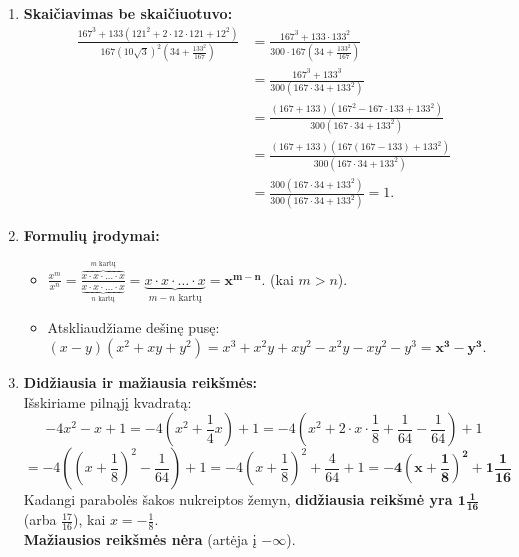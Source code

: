 \documentclass[12pt,a4paper]{article}
\begin{document}
\begin{enumerate}
    \vspace{0.3cm}
    \item \textbf{Skaičiavimas be skaičiuotuvo:} \\
    \begin{align*}
        \frac{167^3 + 133\left(121^2 + 2 \cdot 12 \cdot 121 + 12^2\right)}
        {167(10\sqrt{3})^2\left(34 + \frac{133^2}{167}\right)}
        &= \frac{167^3 + 133 \cdot 133^2}
        {300 \cdot 167\left(34 + \frac{133^2}{167}\right)} \\
        &= \frac{167^3 + 133^3}
        {300\left(167 \cdot 34 + 133^2\right)} \\
        &= \frac{(167+133)\left(167^2-167 \cdot 133+133^2\right)}
        {300\left(167 \cdot 34 + 133^2\right)} \\
        &= \frac{(167+133)\left(167(167-133)+133^2\right)}
        {300\left(167 \cdot 34 + 133^2\right)} \\
        &= \frac{300\left(167 \cdot 34 + 133^2\right)}
        {300\left(167 \cdot 34 + 133^2\right)} = 1.
    \end{align*}

    \vspace{0.3cm}
    \item \textbf{Formulių įrodymai:}
    \begin{itemize}
        \item[a)] $\displaystyle \frac{x^m}{x^n} = \frac{\overbrace{x \cdot x \cdot \dots \cdot x}^{m \text{ kartų}}}{\underbrace{x \cdot x \cdot \dots \cdot x}_{n \text{ kartų}}} = \underbrace{x \cdot x \cdot \dots \cdot x}_{m-n \text{ kartų}} = \mathbf{x^{m-n}}.$ (kai $m > n$).
        \item[b)] Atskliaudžiame dešinę pusę: \\
        $(x-y)(x^2 + xy + y^2) = x^3 + x^2y + xy^2 - x^2y - xy^2 - y^3 = \mathbf{x^3 - y^3}.$
    \end{itemize}

    \vspace{0.3cm}
    \item \textbf{Didžiausia ir mažiausia reikšmės:} \\
    Išskiriame pilnąjį kvadratą:
    $$ -4x^2 - x + 1 = -4\left(x^2 + \frac{1}{4}x\right) + 1 = -4\left(x^2 + 2 \cdot x \cdot \frac{1}{8} + \frac{1}{64} - \frac{1}{64}\right) + 1 $$
    $$ = -4\left( \left(x + \frac{1}{8}\right)^2 - \frac{1}{64} \right) + 1 = -4\left(x + \frac{1}{8}\right)^2 + \frac{4}{64} + 1 = \mathbf{-4\left(x + \frac{1}{8}\right)^2 + 1\frac{1}{16}} $$
    Kadangi parabolės šakos nukreiptos žemyn, \textbf{didžiausia reikšmė yra $\mathbf{1\frac{1}{16}}$} (arba $\frac{17}{16}$), kai $x = -\frac{1}{8}$. \\
    \textbf{Mažiausios reikšmės nėra} (artėja į $-\infty$).


\end{enumerate}
\end{document}
